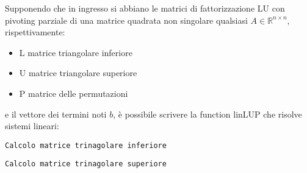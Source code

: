 \begin{flushleft}
Supponendo che in ingresso si abbiano le matrici di fattorizzazione LU con pivoting parziale di una matrice quadrata non singolare qualsiasi $A \in \mathbb{R}^{n \times n}$, rispettivamente:
\begin{itemize}
    \item L matrice triangolare inferiore
    \item U matrice triangolare superiore 
    \item P matrice delle permutazioni
\end{itemize}
e il vettore dei termini noti $b$, è possibile scrivere la function linLUP che risolve sistemi lineari:

\texttt{Calcolo matrice trinagolare inferiore}

\texttt{Calcolo matrice trinagolare superiore}

\end{flushleft}